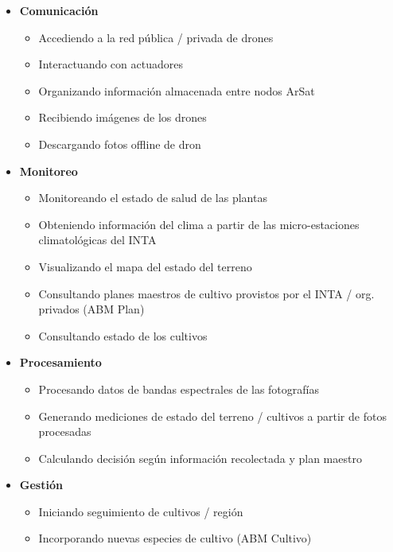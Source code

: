 \begin{itemize} \itemsep -2pt
    \item \textbf{Comunicación}
    \vspace{-7pt}
    \begin{itemize} \itemsep -2pt
        \item Accediendo a la red pública / privada de drones
		\item Interactuando con actuadores
		\item Organizando información almacenada entre nodos ArSat
        \item Recibiendo imágenes de los drones
		\item Descargando fotos offline de dron
    \end{itemize}
    \item \textbf{Monitoreo}
    \vspace{-7pt}
    \begin{itemize} \itemsep -2pt
        \item Monitoreando el estado de salud de las plantas
		\item Obteniendo información del clima a partir de las micro-estaciones climatológicas del INTA
		\item Visualizando el mapa del estado del terreno
		\item Consultando planes maestros de cultivo provistos por el INTA / org. privados (ABM Plan)
		\item Consultando estado de los cultivos
    \end{itemize}
    \item \textbf{Procesamiento}
    \vspace{-7pt}
    \begin{itemize} \itemsep -2pt
    	\item Procesando datos de bandas espectrales de las fotografías
		\item Generando mediciones de estado del terreno / cultivos a partir de fotos procesadas
        \item Calculando decisión según información recolectada y plan maestro
    \end{itemize}
    \item \textbf{Gestión}
    \vspace{-7pt}
    \begin{itemize} \itemsep -2pt
		\item Iniciando seguimiento de cultivos / región
		\item Incorporando nuevas especies de cultivo (ABM Cultivo)

\end{itemize}
\end{itemize}
